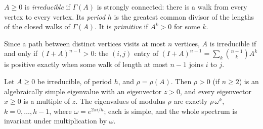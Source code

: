 \begin{definition}\label{def:irreducible}
$A\ge0$ is \emph{irreducible} if $\Gamma(A)$ is strongly connected: there is a walk from every vertex to every vertex. Its
\emph{period} $h$ is the greatest common divisor of the lengths of the closed walks of $\Gamma(A)$. It is \emph{primitive} if
$A^k>0$ for some $k$.
\end{definition}

Since a path between distinct vertices visits at most $n$ vertices, $A$ is irreducible if and only if $(I+A)^{n-1}>0$: the
$(i,j)$ entry of $(I+A)^{n-1}=\sum_k\binom{n-1}kA^k$ is positive exactly when some walk of length at most $n-1$ joins $i$ to $j$.

\begin{theorem}[Frobenius, 1912]\label{thm:frobenius}
Let $A\ge0$ be irreducible, of period $h$, and $\rho=\rho(A)$. Then $\rho>0$ (if $n\ge2$) is an algebraically simple
eigenvalue with an eigenvector $z>0$, and every eigenvector $x\ge0$ is a multiple of $z$. The eigenvalues of modulus $\rho$ are
exactly $\rho\,\omega^k$, $k=0,\dots,h-1$, where $\omega=e^{2\pi i/h}$; each is simple, and the whole spectrum is invariant under
multiplication by $\omega$.
\end{theorem}
